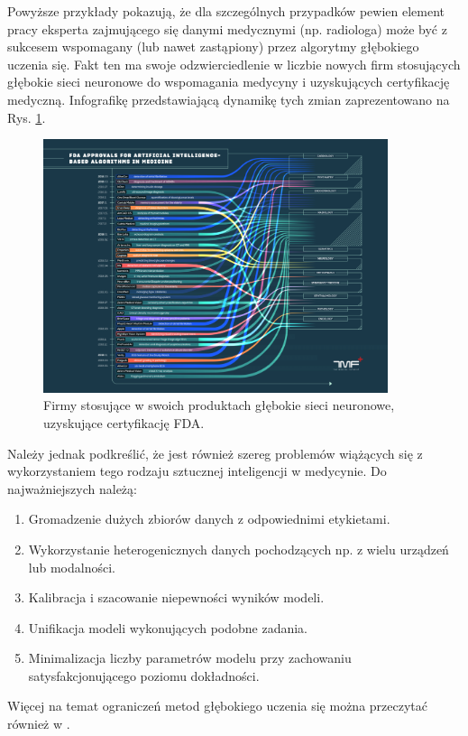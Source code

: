 Powyższe przykłady pokazują, że dla szczególnych przypadków pewien element pracy eksperta zajmującego się danymi medycznymi (np. radiologa) może być z sukcesem wspomagany (lub nawet zastąpiony) przez algorytmy głębokiego uczenia się. Fakt ten ma swoje odzwierciedlenie w liczbie nowych firm stosujących głębokie sieci neuronowe do wspomagania medycyny i uzyskujących certyfikację medyczną. Infografikę przedstawiającą dynamikę tych zmian zaprezentowano na Rys. \ref{fda_cert}.

\begin{figure}[h!]
	\centering
	\includegraphics[width=0.9\textwidth]{figures/fda_for_ai.png}
	\caption{Firmy stosujące w swoich produktach głębokie sieci neuronowe, uzyskujące certyfikację FDA.}
	\label{fda_cert}
\end{figure}

Należy jednak podkreślić, że jest również szereg problemów wiążących się z wykorzystaniem tego rodzaju sztucznej inteligencji w medycynie. Do najważniejszych należą:
\begin{enumerate}
	\item Gromadzenie dużych zbiorów danych z odpowiednimi etykietami.
	\item Wykorzystanie heterogenicznych danych pochodzących np. z wielu urządzeń lub modalności.
	\item Kalibracja i szacowanie niepewności wyników modeli.
	\item Unifikacja modeli wykonujących podobne zadania.
	\item Minimalizacja liczby parametrów modelu przy zachowaniu satysfakcjonującego poziomu dokładności.
\end{enumerate}
Więcej na temat ograniczeń metod głębokiego uczenia się można przeczytać również w \cite{Marcus2018}.

